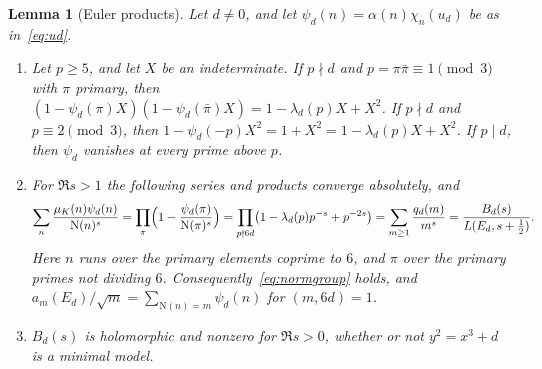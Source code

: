 \documentclass[11pt]{article}
\numberwithin{equation}{section}
\newcommand{\N}{\mathrm N}
\newcommand{\muk}{\mu_K}
\newtheorem{lemma}{Lemma}
\begin{document}
\begin{lemma}[Euler products]\label{lem:b1-euler}
Let $d\ne0$, and let $\psi_d(n)=\alpha(n)\chi_n(u_d)$ be as in~\eqref{eq:ud}.
\begin{enumerate}
\item[(a)] Let $p\ge5$, and let $X$ be an indeterminate. If $p\nmid d$ and $p=\pi\bar\pi\equiv1\pmod3$ with
 $\pi$ primary, then $(1-\psi_d(\pi)X)(1-\psi_d(\bar\pi)X)=1-\lambda_d(p)X+X^2$. If $p\nmid d$ and $p\equiv2\pmod3$,
 then $1-\psi_d(-p)X^2=1+X^2=1-\lambda_d(p)X+X^2$. If $p\mid d$, then $\psi_d$ vanishes at every prime above $p$.
\item[(b)] For $\Re s>1$ the following series and products converge absolutely, and
 \begin{equation}\label{eq:b1-euler}
  \sum_n\frac{\muk(n)\psi_d(n)}{\N(n)^s}
  =\prod_\pi\Bigl(1-\frac{\psi_d(\pi)}{\N(\pi)^s}\Bigr)
  =\prod_{p\nmid6d}\bigl(1-\lambda_d(p)p^{-s}+p^{-2s}\bigr)
  =\sum_{m\ge1}\frac{q_d(m)}{m^s}
  =\frac{B_d(s)}{L(E_d,s+\frac12)} .
 \end{equation}
 Here $n$ runs over the primary elements coprime to $6$, and $\pi$ over the primary primes not dividing $6$.
 Consequently~\eqref{eq:normgroup} holds, and $a_m(E_d)/\sqrt m=\sum_{\N(n)=m}\psi_d(n)$ for $(m,6d)=1$.
\item[(c)] $B_d(s)$ is holomorphic and nonzero for $\Re s>0$, whether or not $y^2=x^3+d$ is a minimal model.
\end{enumerate}
\end{lemma}
\end{document}
